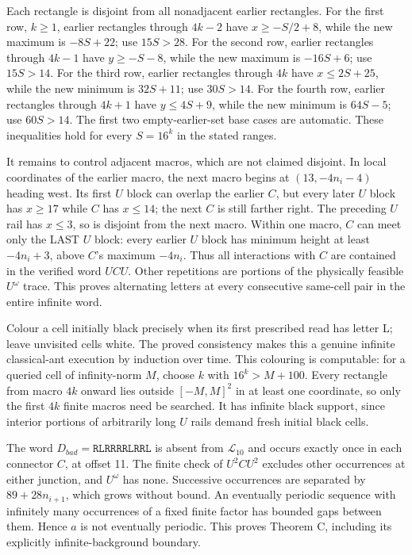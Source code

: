 \documentclass[
  11pt,
]{article}
\begin{document}
Each rectangle is disjoint from all nonadjacent earlier rectangles. For
the first row, \(k\ge1\), earlier rectangles through \(4k-2\) have
\(x\ge-S/2+8\), while the new maximum is \(-8S+22\); use \(15S>28\). For
the second row, earlier rectangles through \(4k-1\) have \(y\ge-S-8\),
while the new maximum is \(-16S+6\); use \(15S>14\). For the third row,
earlier rectangles through \(4k\) have \(x\le2S+25\), while the new
minimum is \(32S+11\); use \(30S>14\). For the fourth row, earlier
rectangles through \(4k+1\) have \(y\le4S+9\), while the new minimum is
\(64S-5\); use \(60S>14\). The first two empty-earlier-set base cases
are automatic. These inequalities hold for every \(S=16^k\) in the
stated ranges.

It remains to control adjacent macros, which are not claimed disjoint.
In local coordinates of the earlier macro, the next macro begins at
\((13,-4n_i-4)\) heading west. Its first \(U\) block can overlap the
earlier \(C\), but every later \(U\) block has \(x\ge17\) while \(C\)
has \(x\le14\); the next \(C\) is still farther right. The preceding
\(U\) rail has \(x\le3\), so is disjoint from the next macro. Within one
macro, \(C\) can meet only the LAST \(U\) block: every earlier \(U\)
block has minimum height at least \(-4n_i+3\), above \(C\)'s maximum
\(-4n_i\). Thus all interactions with \(C\) are contained in the
verified word \(UCU\). Other repetitions are portions of the physically
feasible \(U^\omega\) trace. This proves alternating letters at every
consecutive same-cell pair in the entire infinite word.

Colour a cell initially black precisely when its first prescribed read
has letter L; leave unvisited cells white. The proved consistency makes
this a genuine infinite classical-ant execution by induction over time.
This colouring is computable: for a queried cell of infinity-norm \(M\),
choose \(k\) with \(16^k>M+100\). Every rectangle from macro \(4k\)
onward lies outside \([-M,M]^2\) in at least one coordinate, so only the
first \(4k\) finite macros need be searched. It has infinite black
support, since interior portions of arbitrarily long \(U\) rails demand
fresh initial black cells.

The word \(D_{bad}=\mathtt{RLRRRRLRRL}\) is absent from
\(\mathcal L_{10}\) and occurs exactly once in each connector \(C\), at
offset 11. The finite check of \(U^2CU^2\) excludes other occurrences at
either junction, and \(U^\omega\) has none. Successive occurrences are
separated by \(89+28n_{i+1}\), which grows without bound. An eventually
periodic sequence with infinitely many occurrences of a fixed finite
factor has bounded gaps between them. Hence \(a\) is not eventually
periodic. This proves Theorem C, including its explicitly
infinite-background boundary.
\end{document}
